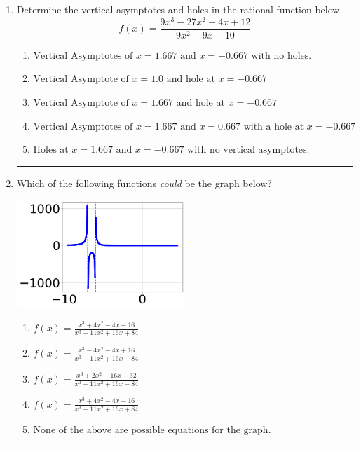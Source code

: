 \documentclass[14pt]{extbook}
\newcommand{\litem}[1]{\item#1\hspace*{-1cm}\rule{\textwidth}{0.4pt}}
\begin{document}
\begin{enumerate}
{\begin{enumerate}[label=\Alph*.]
\end{enumerate} }
\litem{
Determine the vertical asymptotes and holes in the rational function below.\[ f(x) = \frac{9x^{3} -27 x^{2} -4 x + 12}{9x^{2} -9 x -10} \]\begin{enumerate}[label=\Alph*.]
\item \( \text{Vertical Asymptotes of } x = 1.667 \text{ and } x = -0.667 \text{ with no holes.} \)
\item \( \text{Vertical Asymptote of } x = 1.0 \text{ and hole at } x = -0.667 \)
\item \( \text{Vertical Asymptote of } x = 1.667 \text{ and hole at } x = -0.667 \)
\item \( \text{Vertical Asymptotes of } x = 1.667 \text{ and } x = 0.667 \text{ with a hole at } x = -0.667 \)
\item \( \text{Holes at } x = 1.667 \text{ and } x = -0.667 \text{ with no vertical asymptotes.} \)

\end{enumerate} }
\litem{
Which of the following functions \textit{could} be the graph below?
\begin{center}
    \includegraphics[width=0.5\textwidth]{../Figures/identifyGraphOfRationalFunctionCopyA.png}
\end{center}
\begin{enumerate}[label=\Alph*.]
\item \( f(x)=\frac{x^{3} +4 x^{2} -4 x -16}{x^{3} -11 x^{2} +16 x + 84} \)
\item \( f(x)=\frac{x^{3} -4 x^{2} -4 x + 16}{x^{3} +11 x^{2} +16 x -84} \)
\item \( f(x)=\frac{x^{3} +2 x^{2} -16 x -32}{x^{3} +11 x^{2} +16 x -84} \)
\item \( f(x)=\frac{x^{3} +4 x^{2} -4 x -16}{x^{3} -11 x^{2} +16 x + 84} \)
\item \( \text{None of the above are possible equations for the graph.} \)

\end{enumerate} }
\end{enumerate}
\end{document}
